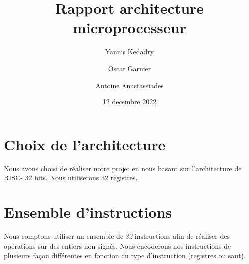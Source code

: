 \documentclass{article}
\title{Rapport architecture microprocesseur}
\author{Yannis Kedadry \and Oscar Garnier \and Antoine Anastassiades }
\date{12 decembre 2022}
\newcommand{\RNum}[1]{\uppercase\expandafter{\romannumeral #1\relax}}
\newcommand{\risc}{RISC-\RNum{5}}
\begin{document}
\maketitle

\section{Choix de l'architecture}
Nous avons choisi de réaliser notre projet en nous basant sur l'architecture de \risc{} 32 bits. Nous utiliserons 32 registres.

\section{Ensemble d'instructions}
Nous comptons utiliser un ensemble de \emph{32} instructions afin de réaliser des opérations sur des entiers non signés. Nous encoderons nos instructions de plusieurs façon différentes en fonction du type d'instruction (registres ou saut).
\end{document}
